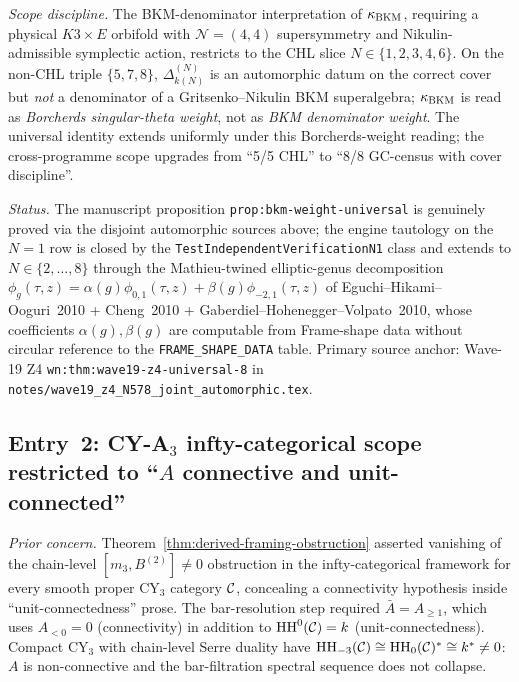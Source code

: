 \emph{Scope discipline.}  The BKM-denominator interpretation of $\kappa_{\mathrm{BKM}}$,
requiring a physical $K3 \times E$ orbifold with $\mathcal{N} = (4, 4)$
supersymmetry and Nikulin-admissible symplectic action, restricts to
the CHL slice $N \in \{1, 2, 3, 4, 6\}$.  On the non-CHL triple
$\{5, 7, 8\}$, $\Delta_{k(N)}^{(N)}$ is an automorphic datum on the
correct cover but \emph{not} a denominator of a Gritsenko--Nikulin BKM
superalgebra; $\kappa_{\mathrm{BKM}}$ is read as \emph{Borcherds singular-theta weight},
not as \emph{BKM denominator weight}.  The universal identity extends
uniformly under this Borcherds-weight reading; the cross-programme
scope upgrades from ``5/5 CHL'' to ``8/8 GC-census with cover
discipline''.

\emph{Status.} \ClaimStatusHealed{}  The manuscript proposition
\texttt{prop:bkm-weight-universal} is genuinely proved via the disjoint
automorphic sources above; the engine tautology on the $N = 1$ row is
closed by the \texttt{TestIndependentVerificationN1} class and extends
to $N \in \{2, \ldots, 8\}$ through the Mathieu-twined elliptic-genus
decomposition $\phi_g(\tau, z) = \alpha(g) \phi_{0, 1}(\tau, z) +
\beta(g) \phi_{-2, 1}(\tau, z)$ of Eguchi--Hikami--Ooguri~2010 +
Cheng~2010 + Gaberdiel--Hohenegger--Volpato~2010, whose coefficients
$\alpha(g), \beta(g)$ are computable from Frame-shape data without
circular reference to the \texttt{FRAME\_SHAPE\_DATA} table.
Primary source anchor: Wave-19 Z4 \texttt{wn:thm:wave19-z4-universal-8}
in \texttt{notes/wave19\_z4\_N578\_joint\_automorphic.tex}.

\subsection*{Entry~2: CY-A$_3$ infty-categorical scope restricted to
``$A$ connective and unit-connected''}
\label{wn:sec:tautology-healing-entry2}

\emph{Prior concern.} Theorem~\ref{thm:derived-framing-obstruction}
asserted vanishing of the chain-level $[m_3, B^{(2)}] \neq 0$
obstruction in the infty-categorical framework for every smooth proper
CY$_3$ category $\mathcal{C}$, concealing a connectivity hypothesis inside
``unit-connectedness'' prose.  The bar-resolution step required
$\bar{A} = A_{\geq 1}$, which uses $A_{< 0} = 0$ (connectivity) in
addition to $\mathrm{HH}^0(\mathcal{C}) = k$ (unit-connectedness).  Compact CY$_3$
with chain-level Serre duality have $\mathrm{HH}_{-3}(\mathcal{C}) \cong \mathrm{HH}_0(\mathcal{C})^*
\cong k^* \neq 0$: $A$ is non-connective and the bar-filtration
spectral sequence does not collapse.

